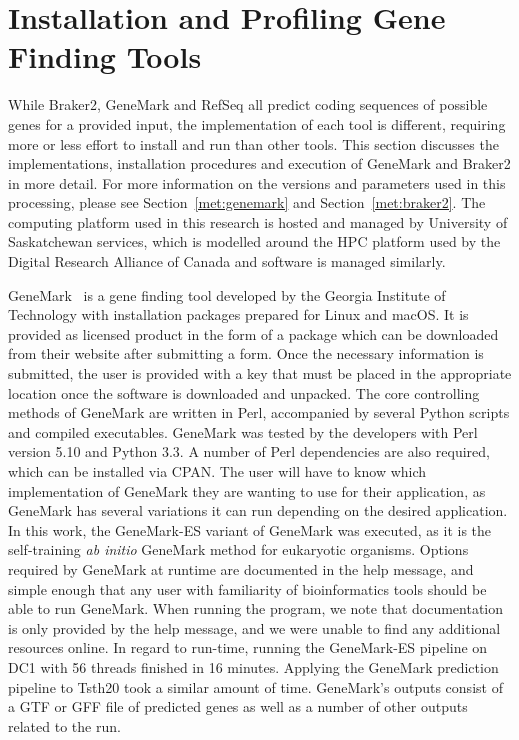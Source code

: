 \section{Installation and Profiling Gene Finding Tools}
\label{section:profiling}

While Braker2, GeneMark and RefSeq all predict coding sequences of
possible genes for a provided input, the implementation of each tool
is different, requiring more or less effort to install and run than
other tools. This section discusses the implementations, installation
procedures and execution of GeneMark and Braker2 in more detail. For
more information on the versions and parameters used in this
processing, please see Section~\ref{met:genemark} and Section~\ref{met:braker2}. The computing
platform used in this research is hosted and managed by University of
Saskatchewan services, which is modelled around the HPC platform used
by the Digital Research Alliance of Canada and software is managed
similarly.

GeneMark~\cite{borodovsky2011a} is a gene finding tool developed by
the Georgia Institute of Technology with installation packages prepared for Linux
and macOS. It is provided as licensed product in the form of a package
which can be downloaded from their website after submitting a
form. Once the necessary information is submitted, the user is
provided with a key that must be placed in the appropriate location
once the software is downloaded and unpacked. The core controlling
methods of GeneMark are written in Perl, accompanied by several Python
scripts and compiled executables. GeneMark was tested by the
developers with Perl version 5.10 and Python 3.3. A number of Perl
dependencies are also required, which can be installed via CPAN. The
user will have to know which implementation of GeneMark they are
wanting to use for their application, as GeneMark has several
variations it can run depending on the desired application. In this
work, the GeneMark-ES variant of GeneMark was executed, as it is the
self-training \textit{ab initio} GeneMark method for eukaryotic
organisms. Options required by GeneMark at runtime are documented in
the help message, and simple enough that any user with familiarity of
bioinformatics tools should be able to run GeneMark. When running the program, we note that documentation is only provided by the help message, and we were unable to find any additional resources online. In regard to run-time, running
the GeneMark-ES pipeline on DC1 with 56 threads finished in 16
minutes. Applying the GeneMark prediction pipeline to Tsth20 took a similar amount of time. GeneMark's outputs consist of a GTF or GFF file of predicted
genes as well as a number of other outputs related to the run.

